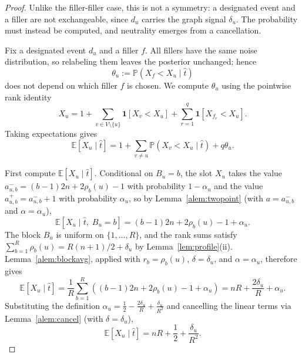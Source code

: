 \documentclass[11pt]{article}
\newcommand{\E}{\mathbb{E}}
\newcommand{\Prb}{\mathbb{P}}
\newcommand{\ind}{\mathbf{1}}
\begin{document}
\begin{proof}
Unlike the filler-filler case, this is not a symmetry: a designated event and a filler are not exchangeable, since $d_u$ carries the graph signal $\delta_u$.  The probability must instead be computed, and neutrality emerges from a cancellation.

Fix a designated event $d_u$ and a filler $f$.  All fillers have the same noise distribution, so relabeling them leaves the posterior unchanged; hence
\begin{equation}
  \theta_u:=\Prb(X_f<X_u\mid \hat t)
\end{equation}
does not depend on which filler $f$ is chosen.  We compute $\theta_u$ using the pointwise rank identity
\begin{equation}
  X_u=1+
  \sum_{v\in V\setminus\{u\}}\ind[X_v<X_u]
  +\sum_{r=1}^q\ind[X_{f_r}<X_u].
\end{equation}
Taking expectations gives
\begin{equation}
  \E[X_u\mid \hat t]
  =1+
  \sum_{v\ne u}\Prb(X_v<X_u\mid \hat t)
  +q\theta_u.
\end{equation}

First compute $\E[X_u\mid \hat t]$.  Conditional on $B_u=b$, the slot $X_u$ takes the value $a_{u,b}^-=(b-1)2n+2\rho_b(u)-1$ with probability $1-\alpha_u$ and the value $a_{u,b}^+=a_{u,b}^-+1$ with probability $\alpha_u$, so by Lemma~\ref{alem:twopoint} (with $a=a_{u,b}^-$ and $\alpha=\alpha_u$),
\begin{equation}
  \E[X_u\mid \hat t,\;B_u=b]=(b-1)2n+2\rho_b(u)-1+\alpha_u.
\end{equation}
The block $B_u$ is uniform on $\{1,\ldots,R\}$, and the rank sums satisfy $\sum_{b=1}^R\rho_b(u)=R(n+1)/2+\delta_u$ by Lemma~\ref{lem:profile}(ii).  Lemma~\ref{alem:blockavg}, applied with $r_b=\rho_b(u)$, $\delta=\delta_u$, and $\alpha=\alpha_u$, therefore gives
\begin{equation}
  \E[X_u\mid \hat t]
  =\frac1R\sum_{b=1}^R\left((b-1)2n+2\rho_b(u)-1+\alpha_u\right)
  =nR+\frac{2\delta_u}{R}+\alpha_u.
\end{equation}
Substituting the definition $\alpha_u=\tfrac12-\tfrac{2\delta_u}{R}+\tfrac{\delta_u}{R^2}$ and cancelling the linear terms via Lemma~\ref{alem:cancel} (with $\delta=\delta_u$),
\begin{equation}
  \E[X_u\mid \hat t]=nR+\frac12+\frac{\delta_u}{R^2}.
\end{equation}


\end{proof}
\end{document}
